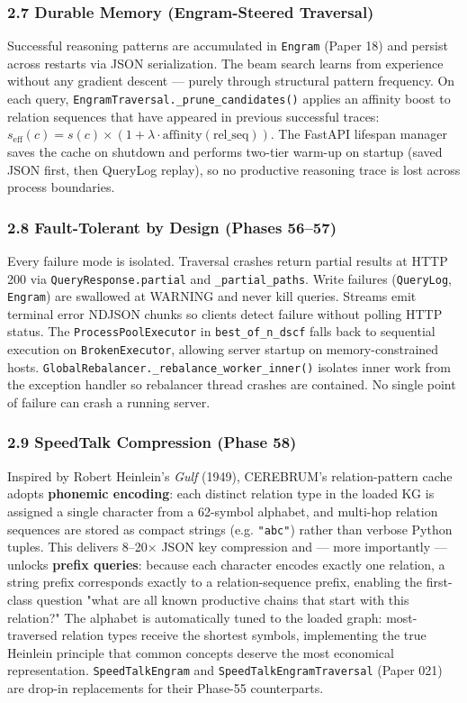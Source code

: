 \subsubsection*{2.7 Durable Memory (Engram-Steered Traversal)}
Successful reasoning patterns are accumulated in \texttt{Engram} (Paper 18) and persist across restarts via JSON serialization. The beam search learns from experience without any gradient descent --- purely through structural pattern frequency. On each query, \texttt{EngramTraversal.\_prune\_candidates()} applies an affinity boost to relation sequences that have appeared in previous successful traces: $s_\text{eff}(c) = s(c) \times (1 + \lambda \cdot \text{affinity}(\text{rel\_seq}))$. The FastAPI lifespan manager saves the cache on shutdown and performs two-tier warm-up on startup (saved JSON first, then QueryLog replay), so no productive reasoning trace is lost across process boundaries.

\subsubsection*{2.8 Fault-Tolerant by Design (Phases 56--57)}
Every failure mode is isolated. Traversal crashes return partial results at HTTP 200 via \texttt{QueryResponse.partial} and \texttt{\_partial\_paths}. Write failures (\texttt{QueryLog}, \texttt{Engram}) are swallowed at WARNING and never kill queries. Streams emit terminal error NDJSON chunks so clients detect failure without polling HTTP status. The \texttt{ProcessPoolExecutor} in \texttt{best\_of\_n\_dscf} falls back to sequential execution on \texttt{BrokenExecutor}, allowing server startup on memory-constrained hosts. \texttt{GlobalRebalancer.\_rebalance\_worker\_inner()} isolates inner work from the exception handler so rebalancer thread crashes are contained. No single point of failure can crash a running server.

\subsubsection*{2.9 SpeedTalk Compression (Phase 58)}
Inspired by Robert Heinlein's \textit{Gulf} (1949), CEREBRUM's relation-pattern cache adopts \textbf{phonemic encoding}: each distinct relation type in the loaded KG is assigned a single character from a 62-symbol alphabet, and multi-hop relation sequences are stored as compact strings (e.g. \texttt{"abc"}) rather than verbose Python tuples. This delivers 8--20$\times$ JSON key compression and --- more importantly --- unlocks \textbf{prefix queries}: because each character encodes exactly one relation, a string prefix corresponds exactly to a relation-sequence prefix, enabling the first-class question "what are all known productive chains that start with this relation?" The alphabet is automatically tuned to the loaded graph: most-traversed relation types receive the shortest symbols, implementing the true Heinlein principle that common concepts deserve the most economical representation. \texttt{SpeedTalkEngram} and \texttt{SpeedTalkEngramTraversal} (Paper 021) are drop-in replacements for their Phase-55 counterparts.

